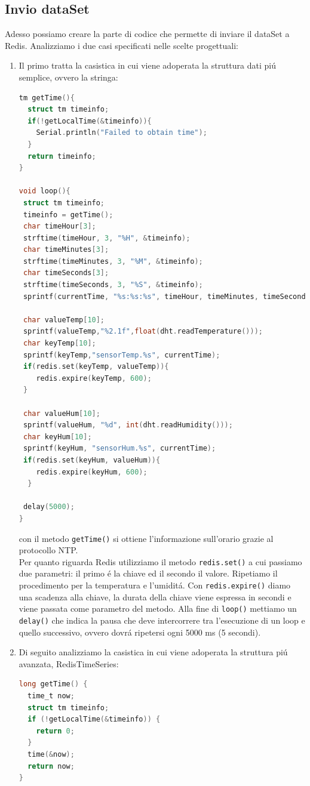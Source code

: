 \subsection{Invio dataSet}
Adesso possiamo creare la parte di codice che permette di inviare il dataSet a Redis.
Analizziamo i due casi specificati nelle scelte progettuali:
\begin{enumerate}
    \item Il primo tratta la casistica in cui viene adoperata la struttura dati piú semplice, ovvero la stringa:
\begin{lstlisting}[autogobble, style=c, language=C]
tm getTime(){
  struct tm timeinfo;
  if(!getLocalTime(&timeinfo)){
    Serial.println("Failed to obtain time");
  }
  return timeinfo;
}

void loop(){
 struct tm timeinfo;
 timeinfo = getTime();
 char timeHour[3];
 strftime(timeHour, 3, "%H", &timeinfo);
 char timeMinutes[3];
 strftime(timeMinutes, 3, "%M", &timeinfo);
 char timeSeconds[3];
 strftime(timeSeconds, 3, "%S", &timeinfo);
 sprintf(currentTime, "%s:%s:%s", timeHour, timeMinutes, timeSeconds );

 char valueTemp[10];
 sprintf(valueTemp,"%2.1f",float(dht.readTemperature()));
 char keyTemp[10];
 sprintf(keyTemp,"sensorTemp.%s", currentTime);
 if(redis.set(keyTemp, valueTemp)){
    redis.expire(keyTemp, 600);
 }

 char valueHum[10];
 sprintf(valueHum, "%d", int(dht.readHumidity()));
 char keyHum[10];
 sprintf(keyHum, "sensorHum.%s", currentTime);
 if(redis.set(keyHum, valueHum)){
    redis.expire(keyHum, 600);
  }

 delay(5000);
}\end{lstlisting}

con il metodo \texttt{getTime()} si ottiene l'informazione sull'orario grazie al protocollo NTP.\\
Per quanto riguarda Redis utilizziamo il metodo \texttt{redis.set()} a cui passiamo due parametri:
il primo é la chiave ed il secondo il valore. Ripetiamo il procedimento per la temperatura e l'umiditá.
Con \texttt{redis.expire()} diamo una scadenza alla chiave, la durata della chiave viene
espressa in secondi e viene passata come parametro del metodo.
Alla fine di \texttt{loop()} mettiamo un \texttt{delay()} che indica la pausa che deve intercorrere tra l'esecuzione
di un loop e quello successivo, ovvero dovrá ripetersi ogni 5000 ms (5 secondi).

    \item Di seguito analizziamo la casistica in cui viene adoperata la struttura piú avanzata, RedisTimeSeries:
\begin{lstlisting}[autogobble, style=c, language=C]
long getTime() {
  time_t now;
  struct tm timeinfo;
  if (!getLocalTime(&timeinfo)) {
    return 0;
  }
  time(&now);
  return now;
}


\end{lstlisting}
\end{enumerate}
